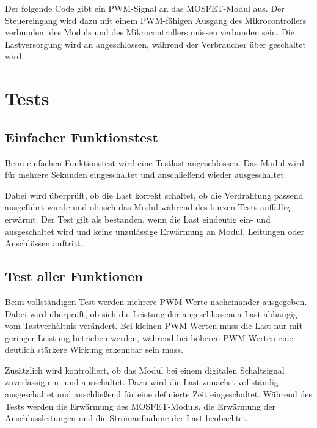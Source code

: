 Der folgende Code gibt ein PWM-Signal an das MOSFET-Modul aus. 
Der Steuereingang  wird dazu mit einem PWM-fähigen Ausgang des Mikrocontrollers verbunden. 
 des Moduls und  des Mikrocontrollers müssen verbunden sein. 
Die Lastversorgung wird an  angeschlossen, während der Verbraucher über  geschaltet wird.

\begin{code}[H]
	\label{Code:MosfetPWMTest}
\end{code}

\section{Tests}

\subsection{Einfacher Funktionstest}

Beim einfachen Funktionstest wird eine Testlast angeschlossen. 
Das Modul wird für mehrere Sekunden eingeschaltet und anschließend wieder ausgeschaltet.

Dabei wird überprüft, ob die Last korrekt schaltet, ob die Verdrahtung passend ausgeführt wurde und ob sich das Modul während des kurzen Tests auffällig erwärmt. 
Der Test gilt als bestanden, wenn die Last eindeutig ein- und ausgeschaltet wird und keine unzulässige Erwärmung an Modul, Leitungen oder Anschlüssen auftritt.

\subsection{Test aller Funktionen}

Beim vollständigen Test werden mehrere PWM-Werte nacheinander ausgegeben. 
Dabei wird überprüft, ob sich die Leistung der angeschlossenen Last abhängig vom Tastverhältnis verändert. 
Bei kleinen PWM-Werten muss die Last nur mit geringer Leistung betrieben werden, während bei höheren PWM-Werten eine deutlich stärkere Wirkung erkennbar sein muss.

Zusätzlich wird kontrolliert, ob das Modul bei einem digitalen Schaltsignal zuverlässig ein- und ausschaltet. 
Dazu wird die Last zunächst vollständig ausgeschaltet und anschließend für eine definierte Zeit eingeschaltet. 
Während des Tests werden die Erwärmung des MOSFET-Moduls, die Erwärmung der Anschlussleitungen und die Stromaufnahme der Last beobachtet. 

